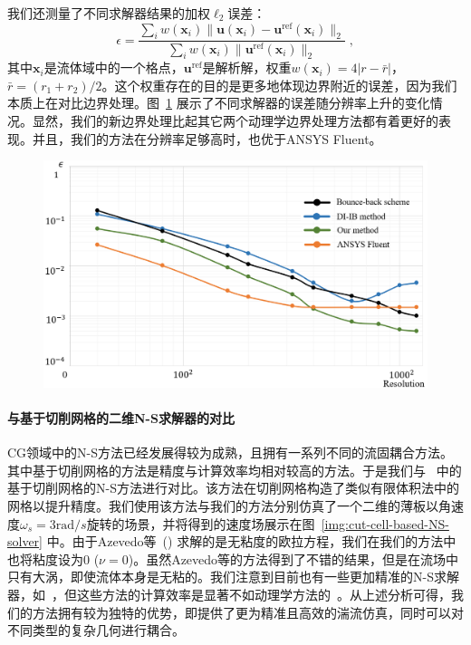 我们还测量了不同求解器结果的加权$\ell_2$误差：
\begin{equation}\label{eq:error_metric}
\epsilon = \frac{\sum_i w(\bm{x}_i)\|\bm{u}(\bm{x}_i)-\bm{u}^{\text{ref}}(\bm{x}_i)\|_2}{\sum_i w(\bm{x}_i)\|\bm{u}^{\text{ref}}(\bm{x}_i)\|_2}\;,
\end{equation}
其中$\bm{x}_i$是流体域中的一个格点，$\bm{u}^{\text{ref}}$是解析解，权重$w(\bm{x}_i) \!=\! 4|r-\bar{r}|$，$\bar{r}\!=\!(r_1+r_2)/2$。这个权重存在的目的是更多地体现边界附近的误差，因为我们本质上在对比边界处理。图~\ref{img:taylor-couette-error-compare} 展示了不同求解器的误差随分辨率上升的变化情况。显然，我们的新边界处理比起其它两个动理学边界处理方法都有着更好的表现。并且，我们的方法在分辨率足够高时，也优于ANSYS Fluent。

\begin{figure}[!htbp]
  \centering
    \includegraphics[width=0.94\columnwidth]{figures/taylor-couette-error-compare.png}
  \label{img:taylor-couette-error-compare}
\end{figure}

\paragraph{与基于切削网格的二维N-S求解器的对比}
CG领域中的N-S方法已经发展得较为成熟，且拥有一系列不同的流固耦合方法。其中基于切削网格的方法是精度与计算效率均相对较高的方法。于是我们与~\cite{Azevedo-2016} 中的基于切削网格的N-S方法进行对比。该方法在切削网格构造了类似有限体积法中的网格以提升精度。我们使用该方法与我们的方法分别仿真了一个二维的薄板以角速度$\omega_s = 3\text{rad}/s$旋转的场景，并将得到的速度场展示在图~\ref{img:cut-cell-based-NS-solver} 中。由于Azevedo等~(\citeyear{Azevedo-2016}) 求解的是无粘度的欧拉方程，我们在我们的方法中也将粘度设为0 ($\nu\!=\!0$)。虽然Azevedo等的方法得到了不错的结果，但是在流场中只有大涡，即使流体本身是无粘的。我们注意到目前也有一些更加精准的N-S求解器，如~\cite{zehnder2018advection,qu2019efficient}，但这些方法的计算效率是显著不如动理学方法的~\cite{Li-2020}。从上述分析可得，我们的方法拥有较为独特的优势，即提供了更为精准且高效的湍流仿真，同时可以对不同类型的复杂几何进行耦合。

